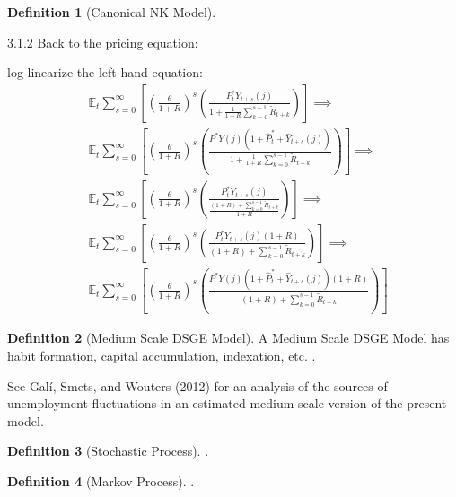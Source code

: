 \documentclass[
	12pt,
	]{article}
\numberwithin{equation}{section}
\theoremstyle{definition}
\newtheorem{definition}{Definition}[section]
\theoremstyle{plain}
\theoremstyle{plain}
\theoremstyle{plain}
\begin{document}
\begin{definition}[Canonical NK Model]

\cite[Lecture 13, p.7]{solis-garcia_ucb_2022}

3.1.2 Back to the pricing equation:

log-linearize the left hand equation:
\begin{align*}
	&\mathbb{E}_t \sum_{s=0}^{\infty} 
	\left[ 
	\left( \frac{\theta}{1+R} \right)^s
	\left( \frac{P_t^\ast Y_{t+s}(j)}{1 + \frac{1}{1+R}
		\sum_{k=0}^{s-1} \widetilde{R}_{t+k}} \right) 
	\right]
	\implies \\
	&\mathbb{E}_t \sum_{s=0}^{\infty} 
	\left[ 
	\left( \frac{\theta}{1+R} \right)^s
	\left( \frac{P^\ast Y(j)(1+\widehat{P}_t^\ast + \widehat{Y}_{t+s}(j))}{1 + \frac{1}{1+R}
		\sum_{k=0}^{s-1} \widetilde{R}_{t+k}} \right) 
	\right] \implies \\
	&\mathbb{E}_t \sum_{s=0}^{\infty} 
	\left[ 
	\left( \frac{\theta}{1+R} \right)^s
	\left( \frac{P_t^\ast Y_{t+s}(j)}{\frac{(1+R)+\sum_{k=0}^{s-1} \widetilde{R}_{t+k}}{1+R}} \right) 
	\right]
	\implies \\
	&\mathbb{E}_t \sum_{s=0}^{\infty} 
	\left[ 
	\left( \frac{\theta}{1+R} \right)^s
	\left( \frac{P_t^\ast Y_{t+s}(j)(1+R)}{(1+R)+\sum_{k=0}^{s-1} \widetilde{R}_{t+k}} \right) 
	\right]
	\implies \\
	&\mathbb{E}_t \sum_{s=0}^{\infty} 
	\left[ 
	\left( \frac{\theta}{1+R} \right)^s
	\left( \frac{P^\ast Y(j)(1+\widehat{P}_t^\ast + \widehat{Y}_{t+s}(j))(1+R)}{(1+R)+\sum_{k=0}^{s-1} \widetilde{R}_{t+k}} \right) 
	\right]
\end{align*}
	
\end{definition}

\begin{definition}[Medium Scale DSGE Model]
	A Medium Scale DSGE Model has habit formation, capital accumulation, indexation, etc. \cite[p.208]{gali_monetary_2015}. 
	
	See Galí, Smets, and Wouters (2012) for an analysis of the sources of unemployment fluctuations in an estimated medium-scale version of the present model.
\end{definition}

\begin{definition}[Stochastic Process]
	\cite[Lecture 5, p.3]{solis-garcia_ucb_2022}.
\end{definition}

\begin{definition}[Markov Process]
	\cite[Lecture 5, p.4]{solis-garcia_ucb_2022}.
\end{definition}
\end{document}

